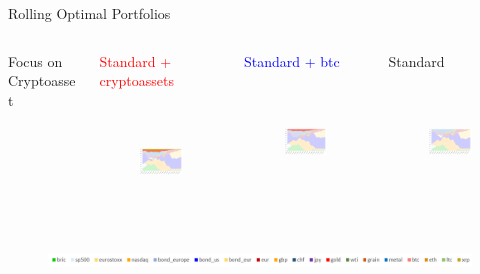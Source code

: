 \documentclass[aspectratio=169]{beamer}
\newcommand\Fontvi{\fontsize{8}{7.2}\selectfont}
\newcommand\Fontci{\fontsize{7}{7.2}\selectfont}
\begin{document}
\begin{frame}[noframenumbering]{Rolling Optimal Portfolios}
\begin{columns}
\begin{column}{0.1\textwidth}
            \Fontci{}Focus on Cryptoasset
		\end{column}
		\begin{column}{0.3\textwidth}  
		    \begin{center}
            \Fontvi{}\textcolor{red}{Standard + cryptoassets}
            \end{center}
            \begin{figure}
                \centering
                \includegraphics[width=4cm, height=3cm]{Images/rolling_allocation/rollcrall.png}
            \end{figure}
		\end{column}
		\begin{column}{0.3\textwidth}  
		    \begin{center}
            \Fontvi{}\textcolor{blue}{Standard + btc}
            \end{center}
            \begin{figure}
                \centering
                \includegraphics[width=4cm, height=3cm]{Images/rolling_allocation/rollcrbtc.png}
            \end{figure}
		\end{column}
    	\begin{column}{0.3\textwidth} 
    	    \begin{center}
            \Fontvi{}Standard
            \end{center}
            \begin{figure}
                \centering
                \includegraphics[width=4cm, height=3cm]{Images/rolling_allocation/rollcrno.png}
            \end{figure}
		\end{column}
	\end{columns}
	\begin{figure}
	    \centering
	    \includegraphics[width=13.5cm]{Images/legend_roll.PNG}
	\end{figure}
\end{frame}
\end{document}
